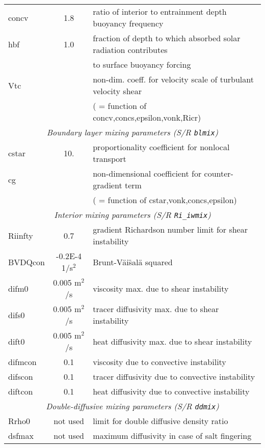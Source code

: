 \begin{table}[h!]
{\begin{tabular}{|l|c|l|}
        concv & 1.8 & 
           ratio of interior to  entrainment depth buoyancy frequency \\
        hbf & 1.0 & 
           fraction of depth to which absorbed solar radiation contributes \\
        ~ & ~ &
           to surface buoyancy forcing \\
        Vtc & \texttt{~} & 
           non-dim. coeff. for velocity scale of turbulant velocity shear \\
        ~ & ~ &
           ( = function of concv,concs,epsilon,vonk,Ricr) \\
      \hline
      \multicolumn{3}{|c|}{\textit{Boundary layer mixing parameters (S/R \texttt{blmix})} } \\
      \hline
        cstar & 10. & 
           proportionality coefficient for nonlocal transport \\
        cg & ~ & 
           non-dimensional coefficient for counter-gradient term \\
        ~ & ~ &
           ( = function of cstar,vonk,concs,epsilon) \\
      \hline
      \multicolumn{3}{|c|}{\textit{Interior mixing parameters (S/R \texttt{Ri\_iwmix})} } \\
      \hline
        Riinfty & 0.7 & 
           gradient Richardson number limit for shear instability \\
        BVDQcon & -0.2E-4 1/s$^2$ & 
           Brunt-V\"ai\"sal\"a squared \\
        difm0 & 0.005 m$^2$/s & 
           viscosity max. due to shear instability \\
        difs0 & 0.005 m$^2$/s & 
           tracer diffusivity max. due to shear instability \\
        dift0 & 0.005 m$^2$/s & 
           heat diffusivity max. due to shear instability \\
        difmcon & 0.1 & 
           viscosity due to convective instability \\
        difscon & 0.1 & 
           tracer diffusivity due to convective instability \\
        diftcon & 0.1 & 
           heat diffusivity due to convective instability \\
      \hline
      \multicolumn{3}{|c|}{\textit{Double-diffusive mixing parameters (S/R \texttt{ddmix})} } \\
      \hline
        Rrho0 & not used & 
           limit for double diffusive density ratio \\
        dsfmax & not used & 
           maximum diffusivity in case of salt fingering \\
         \hline
      \hline
    \end{tabular}
  }
  \caption{~}
\end{table}




